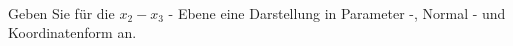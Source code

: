 \begin{aufgabe} ~ \\ 
Geben Sie für die $x_2-x_3$ - Ebene eine Darstellung in Parameter -, Normal - und Koordinatenform an.\end{aufgabe} 
